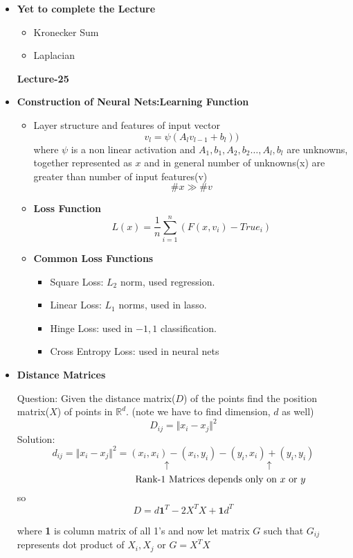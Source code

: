 \documentclass[a4paper]{article}
\numberwithin{equation}{section}
\begin{document}
\begin{itemize}
\item \textbf{Yet to complete the Lecture}
\begin{itemize}
    \item Kronecker Sum
    \item Laplacian
\end{itemize}
\pagebreak
\begin{center}
    \textbf{\Huge{Lecture-25}}
\end{center}
\item \textbf{Construction of Neural Nets:Learning Function}
\begin{itemize}
    \item Layer structure and features of input vector
    \[v_l=\psi  \left(A_{l}v_{l-1}+b_l\right))\]
    where $\psi$ is a non linear activation and $A_1,b_1,A_2,b_2\dots,A_l,b_l$ are unknowns, together represented as $x$ and in general number of unknowns(x) are greater than number of input features(v)\[\#x \gg \# v\]
    \item \textbf{Loss Function}
    \[L(x)=\frac{1}{n}\sum_{i=1}^{n}\left(F(x,v_i)-True_i\right)\]
    \item \textbf{Common Loss Functions}
    \begin{itemize}
        \item Square Loss: $L_2$ norm, used regression.
        \item Linear Loss: $L_1$ norms, used in lasso.
        \item Hinge Loss: used in $-1,1$ classification.
        \item Cross Entropy Loss: used in neural nets
    \end{itemize}
\end{itemize}
\item \textbf{Distance Matrices}

Question: Given the distance matrix($D$) of the points find the position matrix($X$) of points in $\mathbb{R}^d$. (note we have to find dimension, $d$ as well)
\[D_{ij}=\Vert x_i-x_j\Vert^2\]
Solution:
\[d_{ij}=\Vert x_i-x_j\Vert^2=(x_i,x_i)-(x_i,y_i)-(y_i,x_i)+(y_i,y_i)\]
\[\hspace{3cm} \uparrow \hspace{4cm} \uparrow\]
\[\hspace{2.7cm}  \text{Rank-1 Matrices depends only on $x$ or $y$}\]
so 
\[D=d\textbf{1}^T-2X^TX+\textbf{1}d^T\]

where \textbf{1} is column matrix of all 1's and now let matrix $G$ such that $G_{ij}$ represents dot product of $X_i,X_j$ or $G=X^TX$


\end{itemize}
\end{document}
